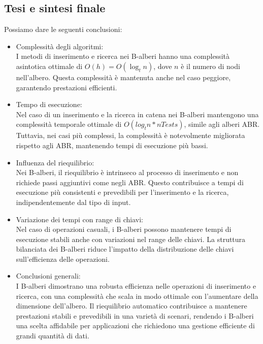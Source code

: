 \subsection{Tesi e sintesi finale}
\label{TesiSintesiFinale_1}
Possiamo dare le seguenti conclusioni:
\begin{itemize}
    \item Complessità degli algoritmi:\\
        I metodi di inserimento e ricerca nei B-alberi hanno una complessità asintotica ottimale di $O(h) = O(\log_t n)$, dove $n$ è il numero di nodi nell'albero. Questa complessità è mantenuta anche nel caso peggiore, garantendo prestazioni efficienti.
    \item Tempo di esecuzione:\\
        Nel caso di un inserimento e la ricerca in catena nei B-alberi mantengono una complessità temporale ottimale di $O(log_t n * nTests)$, simile agli alberi ABR. Tuttavia, nei casi più complessi, la complessità è notevolmente migliorata rispetto agli ABR, mantenendo tempi di esecuzione più bassi.
    
    \item Influenza del riequilibrio:\\
        Nei B-alberi, il riequilibrio è intrinseco al processo di inserimento e non richiede passi aggiuntivi come negli ABR. Questo contribuisce a tempi di esecuzione più consistenti e prevedibili per l'inserimento e la ricerca, indipendentemente dal tipo di input.
    
    \item Variazione dei tempi con range di chiavi:\\
        Nel caso di operazioni casuali, i B-alberi possono mantenere tempi di esecuzione stabili anche con variazioni nel range delle chiavi. La struttura bilanciata dei B-alberi riduce l'impatto della distribuzione delle chiavi sull'efficienza delle operazioni.
    
    \item Conclusioni generali:\\
        I B-alberi dimostrano una robusta efficienza nelle operazioni di inserimento e ricerca, con una complessità che scala in modo ottimale con l'aumentare della dimensione dell'albero. Il riequilibrio automatico contribuisce a mantenere prestazioni stabili e prevedibili in una varietà di scenari, rendendo i B-alberi una scelta affidabile per applicazioni che richiedono una gestione efficiente di grandi quantità di dati.

\end{itemize}




